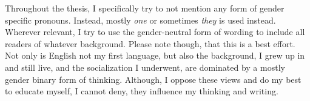 Throughout the thesis, I specifically try to not mention any form of gender specific pronouns.
Instead, mostly \textit{one} or sometimes \textit{they} is used instead. Wherever relevant, I try to
use the gender-neutral form of wording to include all readers of whatever background. Please note
though, that this is a best effort. Not only is English not my first language, but also the
background, I grew up in and still live, and the socialization I underwent, are dominated by a
mostly gender binary form of thinking. Although, I oppose these views and do my best to educate
myself, I cannot deny, they influence my thinking and writing.
